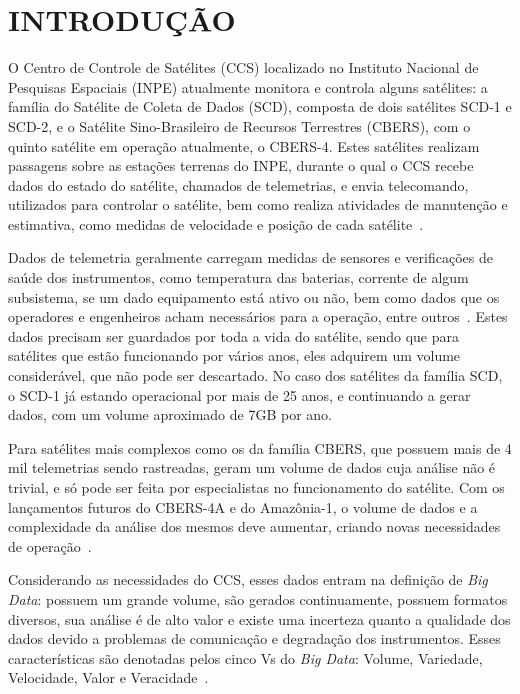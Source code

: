 
\chapter{INTRODUÇÃO}\label{ch:intro}

O Centro de Controle de Satélites (CCS) localizado no Instituto Nacional de Pesquisas Espaciais (INPE) atualmente monitora e controla alguns satélites: a família do Satélite de Coleta de Dados (SCD), composta de dois satélites SCD-1 e SCD-2, e o Satélite Sino-Brasileiro de Recursos Terrestres (CBERS), com o quinto satélite em operação atualmente, o CBERS-4.
Estes satélites realizam passagens sobre as estações terrenas do INPE, durante o qual o CCS recebe dados do estado do satélite, chamados de telemetrias, e envia telecomando, utilizados para controlar o satélite, bem como realiza atividades de manutenção e estimativa, como medidas de velocidade e posição de cada satélite~\cite{AzevedoAmbr:2010:ArSaTe}.

Dados de telemetria geralmente carregam medidas de sensores e verificações de saúde dos instrumentos, como temperatura das baterias, corrente de algum subsistema, se um dado equipamento está ativo ou não, bem como dados que os operadores e engenheiros acham necessários para a operação, entre outros~\cite{larsonSpaceMissionAnalysis1999}.
Estes dados precisam ser guardados por toda a vida do satélite, sendo que para satélites que estão funcionando por vários anos, eles adquirem um volume considerável, que não pode ser descartado.
No caso dos satélites da família SCD, o SCD-1 já estando operacional por mais de 25 anos, e continuando a gerar dados, com um volume aproximado de 7GB por ano.

Para satélites mais complexos como os da família CBERS, que possuem mais de 4 mil telemetrias sendo rastreadas, geram um volume de dados cuja análise não é trivial, e só pode ser feita por especialistas no funcionamento do satélite.
Com os lançamentos futuros do CBERS-4A e do Amazônia-1, o volume de dados e a complexidade da análise dos mesmos deve aumentar, criando novas necessidades de operação~\cite{JulioFoAmbrFerrLour:2017:ChImSp}.

Considerando as necessidades do CCS, esses dados entram na definição de \textit{Big Data}: possuem um grande volume, são gerados continuamente, possuem formatos diversos, sua análise é de alto valor e existe uma incerteza quanto a qualidade dos dados devido a problemas de comunicação e degradação dos instrumentos.
Esses características são denotadas pelos cinco Vs do \textit{Big Data}: Volume, Variedade, Velocidade, Valor e Veracidade~\cite{kacfahemaniUnderstandableBigData2015}.

